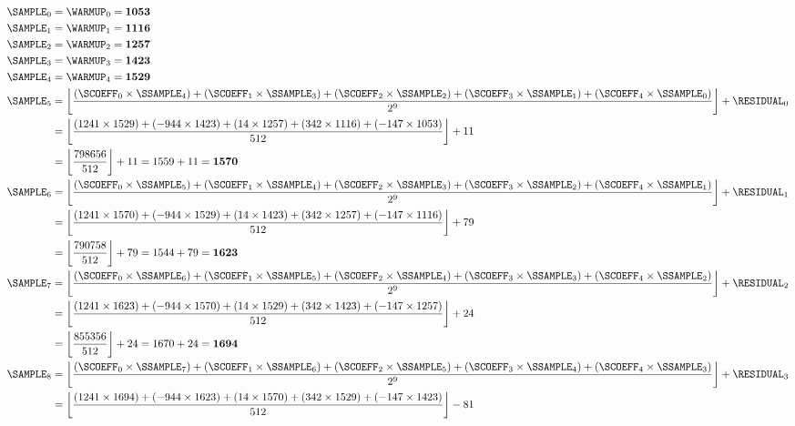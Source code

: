\clearpage
\begin{align*}
\SAMPLE_0 &= \WARMUP_0 = \textbf{1053} \\
\SAMPLE_1 &= \WARMUP_1 = \textbf{1116} \\
\SAMPLE_2 &= \WARMUP_2 = \textbf{1257} \\
\SAMPLE_3 &= \WARMUP_3 = \textbf{1423} \\
\SAMPLE_4 &= \WARMUP_4 = \textbf{1529} \\
\SAMPLE_5 &= \left\lfloor \frac{(\SCOEFF_0 \times \SSAMPLE_4) + (\SCOEFF_1 \times \SSAMPLE_3) + (\SCOEFF_2 \times \SSAMPLE_2) + (\SCOEFF_3 \times \SSAMPLE_1) + (\SCOEFF_4 \times \SSAMPLE_0)}{2 ^ 9}\right\rfloor + \RESIDUAL_0 \\
&= \left\lfloor \frac{(1241 \times 1529) + (-944 \times 1423) + (14 \times 1257) + (342 \times 1116) + (-147 \times 1053)}{512}\right\rfloor + 11 \\
&= \left\lfloor \frac{798656}{512} \right\rfloor + 11 = 1559 + 11 = \textbf{1570} \\
\SAMPLE_6 &= \left\lfloor \frac{(\SCOEFF_0 \times \SSAMPLE_5) + (\SCOEFF_1 \times \SSAMPLE_4) + (\SCOEFF_2 \times \SSAMPLE_3) + (\SCOEFF_3 \times \SSAMPLE_2) + (\SCOEFF_4 \times \SSAMPLE_1)}{2 ^ 9}\right\rfloor + \RESIDUAL_1 \\
&= \left\lfloor \frac{(1241 \times 1570) + (-944 \times 1529) + (14 \times 1423) + (342 \times 1257) + (-147 \times 1116)}{512}\right\rfloor + 79 \\
&= \left\lfloor \frac{790758}{512} \right\rfloor + 79 = 1544 + 79 = \textbf{1623} \\
\SAMPLE_7 &= \left\lfloor \frac{(\SCOEFF_0 \times \SSAMPLE_6) + (\SCOEFF_1 \times \SSAMPLE_5) + (\SCOEFF_2 \times \SSAMPLE_4) + (\SCOEFF_3 \times \SSAMPLE_3) + (\SCOEFF_4 \times \SSAMPLE_2)}{2 ^ 9}\right\rfloor + \RESIDUAL_2 \\
&= \left\lfloor \frac{(1241 \times 1623) + (-944 \times 1570) + (14 \times 1529) + (342 \times 1423) + (-147 \times 1257)}{512}\right\rfloor + 24 \\
&= \left\lfloor \frac{855356}{512} \right\rfloor + 24 = 1670 + 24 = \textbf{1694} \\
\SAMPLE_8 &= \left\lfloor \frac{(\SCOEFF_0 \times \SSAMPLE_7) + (\SCOEFF_1 \times \SSAMPLE_6) + (\SCOEFF_2 \times \SSAMPLE_5) + (\SCOEFF_3 \times \SSAMPLE_4) + (\SCOEFF_4 \times \SSAMPLE_3)}{2 ^ 9}\right\rfloor + \RESIDUAL_3 \\
&= \left\lfloor \frac{(1241 \times 1694) + (-944 \times 1623) + (14 \times 1570) + (342 \times 1529) + (-147 \times 1423)}{512}\right\rfloor - 81 \\

\end{align*}
